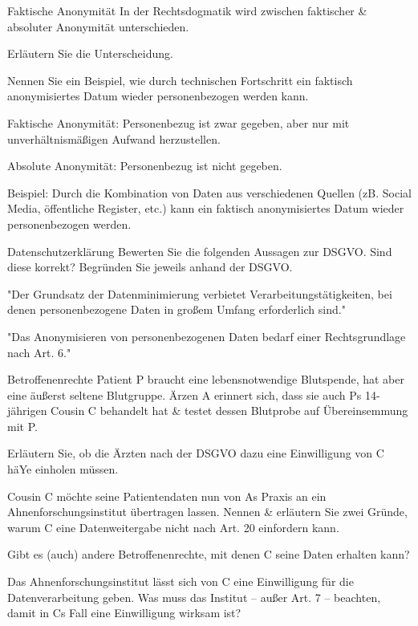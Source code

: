 \documentclass{exercisesheet}
\begin{document}
\begin{eexercises}{Faktische Anonymität}{
    In der Rechtsdogmatik wird zwischen faktischer \& absoluter Anonymität unterschieden.
  }
  \item Erläutern Sie die Unterscheidung.
  \item Nennen Sie ein Beispiel, wie durch technischen Fortschritt ein faktisch anonymisiertes Datum wieder personenbezogen werden kann.
\end{eexercises}

\begin{solutions}
  \item Faktische Anonymität: Personenbezug ist zwar gegeben, aber nur mit unverhältnismäßigen Aufwand herzustellen.\par Absolute Anonymität: Personenbezug ist nicht gegeben.
  \item Beispiel: Durch die Kombination von Daten aus verschiedenen Quellen (zB. Social Media, öffentliche Register, etc.) kann ein faktisch anonymisiertes Datum wieder personenbezogen werden.
\end{solutions}

\begin{eexercises}[2]{Datenschutzerklärung}{
    Bewerten Sie die folgenden Aussagen zur DSGVO. Sind diese korrekt? Begründen Sie jeweils anhand der DSGVO.
  }
  \item "Der Grundsatz der Datenminimierung verbietet Verarbeitungstätigkeiten, bei denen personenbezogene Daten in großem Umfang erforderlich sind."
  \item "Das Anonymisieren von personenbezogenen Daten bedarf einer Rechtsgrundlage nach Art. 6."
\end{eexercises}

\begin{eexercises}{Betroffenenrechte}{
    Patient P braucht eine lebensnotwendige Blutspende, hat aber eine äußerst seltene Blutgruppe. Ärzen A erinnert sich, dass sie auch Ps 14-jährigen Cousin C behandelt hat \& testet dessen Blutprobe auf Übereinsemmung mit P.
  }
  \item Erläutern Sie, ob die Ärzten nach der DSGVO dazu eine Einwilligung von C häYe einholen müssen.
  \item Cousin C möchte seine Patientendaten nun von As Praxis an ein Ahnenforschungsinstitut übertragen lassen. Nennen \& erläutern Sie zwei Gründe, warum C eine Datenweitergabe nicht nach Art. 20 einfordern kann.
  \item Gibt es (auch) andere Betroffenenrechte, mit denen C seine Daten erhalten kann?
  \item Das Ahnenforschungsinstitut lässt sich von C eine Einwilligung für die Datenverarbeitung geben. Was muss das Institut – außer Art. 7 – beachten, damit in Cs Fall eine Einwilligung wirksam ist?
\end{eexercises}
\end{document}

